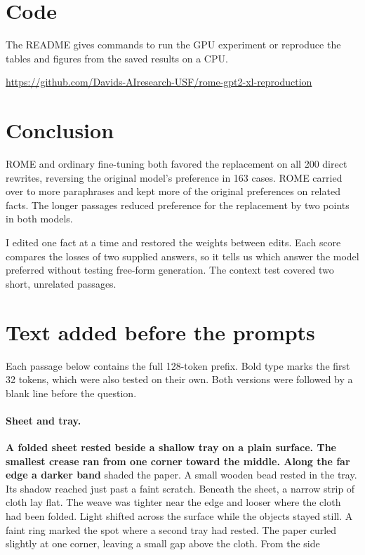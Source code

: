 \documentclass[11pt]{article}
\begin{document}
\section{Code}
The README gives commands to run the GPU experiment or reproduce the tables and figures from the saved results on a CPU.

{\raggedright\noindent\url{https://github.com/Davids-AIresearch-USF/rome-gpt2-xl-reproduction}\par}

\section{Conclusion}
ROME and ordinary fine-tuning both favored the replacement on all 200 direct rewrites, reversing the original model's preference in 163 cases. ROME carried over to more paraphrases and kept more of the original preferences on related facts. The longer passages reduced preference for the replacement by two points in both models.

I edited one fact at a time and restored the weights between edits. Each score compares the losses of two supplied answers, so it tells us which answer the model preferred without testing free-form generation. The context test covered two short, unrelated passages.

\FloatBarrier
\clearpage


\appendix
\section{Text added before the prompts}\label{app:passages}
Each passage below contains the full 128-token prefix. Bold type marks the first 32 tokens, which were also tested on their own. Both versions were followed by a blank line before the question.

\paragraph{Sheet and tray.} \textbf{A folded sheet rested beside a shallow tray on a plain surface. The smallest crease ran from one corner toward the middle. Along the far edge a darker band} shaded the paper. A small wooden bead rested in the tray. Its shadow reached just past a faint scratch. Beneath the sheet, a narrow strip of cloth lay flat. The weave was tighter near the edge and looser where the cloth had been folded. Light shifted across the surface while the objects stayed still. A faint ring marked the spot where a second tray had rested. The paper curled slightly at one corner, leaving a small gap above the cloth. From the side
\end{document}
